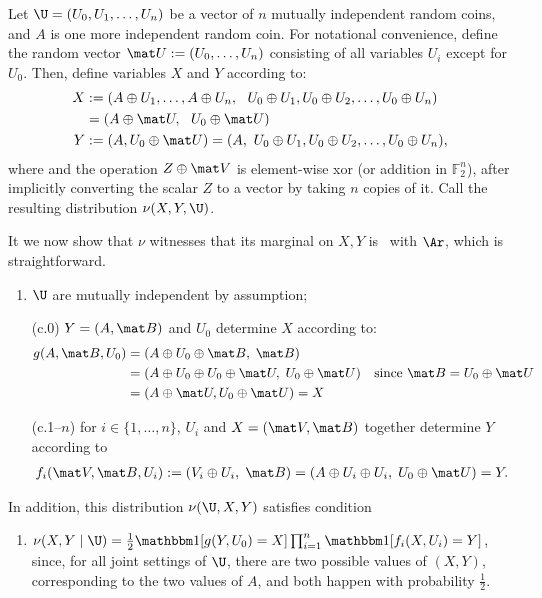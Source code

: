 \begin{subappendices}
\begin{example}
    Let  $\U = (U_0, U_1, \ldots, U_n)$ be a vector of $n$ mutually independent random coins, and $A$ is one more independent random coin. 
    For notational convenience, define the random vector $\mat U := (U_0, \ldots, U_n)$ consisting of all variables $U_i$ except for $U_0$. 
    Then, define variables $X$ and $Y$ according to:
    \begin{align*}
        X &:= 
            ( A \oplus U_1 , \ldots,  A \oplus U_n ,  ~~ U_0 \oplus U_1, U_0 \oplus U_2, \ldots,  U_0 \oplus U_n ) 
            \\
            &= (A \oplus \mat U,~~ U_0 \oplus \mat U)
            \\
        Y &:= (A, U_0 \oplus \mat U ) = (A, ~U_0 \oplus U_1, U_0 \oplus U_2, \ldots,  U_0 \oplus U_n ) 
            ,
    \end{align*}    
    where and the operation $Z \oplus \mat V$ is element-wise xor (or addition in $\mathbb F_2^n$), after implicitly converting the scalar $Z$ to a vector by taking $n$ copies of it. Call the resulting distribution 
    $\nu(X, Y, \U)$. 
    
    It we now show that $\nu$ witnesses that its marginal on $X,Y$ is 
        \scible\ with $\Ar$, which is straightforward.
    \begin{enumerate}[label=(\alph*), start=2]
        \item $\U$ are mutually independent by assumption;
        \item[(c.0)] $Y = (A, \mat B)$ and $U_0$ determine $X$ according to:
        \begin{align*}
            g(A, \mat B, U_0) &= (A \oplus U_0 \oplus \mat B,\; \mat B) \\
                &= (A \oplus U_0 \oplus U_0 \oplus \mat U,\;  U_0 \oplus \mat U) & \text{since } \mat B =U_0 \oplus \mat U \\
                &= (A \oplus \mat U, U_0 \oplus \mat U) = X
        \end{align*}
        \item[(c.1--$n$)] for $i \in \{1, \ldots, n\}$, $U_i$ and $X = (\mat V, \mat B)$ together determine $Y$ according to
        \begin{align*}
            f_i(\mat V, \mat B, U_i) := (V_i \oplus U_i,\; \mat B) 
                = (A \oplus U_i \oplus U_i,\; U_0 \oplus \mat U) = Y.
        \end{align*}
    \end{enumerate}
    In addition, this distribution $\nu(\U, X,Y)$ satisfies condition
    \begin{enumerate}[label=(\alph*), start=4]
    \item $\nu(X,Y \mid \U) = \frac{1}{2} \mathbbm1[ g(Y, U_0) = X] \prod_{i = 1}^n \mathbbm1[ f_i(X, U_i) = Y]$,
    since, for all joint settings of $\U$, there are two possible values of $(X,Y)$, corresponding to the two values of $A$, and both happen with probability $\frac12$. 
    \end{enumerate}
    

\end{example}
\end{subappendices}
